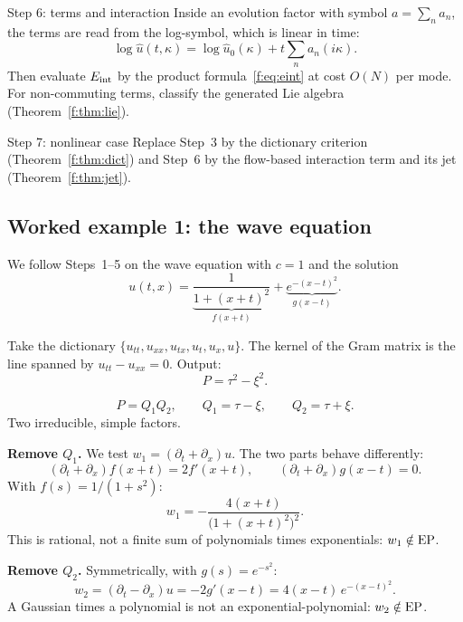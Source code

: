 \begin{aside}{Step 6: terms and interaction}
Inside an evolution factor with symbol $a=\sum_na_n$, the terms are read from the log-symbol, which is linear in time:
\[
\log\hat u(t,\kappa)=\log\hat u_0(\kappa)+t\sum_na_n(i\kappa).
\]
Then evaluate $E_{\mathrm{int}}$ by the product formula~\eqref{f:eq:eint} at cost $O(N)$ per mode. For non-commuting terms, classify the generated Lie algebra (Theorem~\ref{f:thm:lie}).
\end{aside}

\begin{aside}{Step 7: nonlinear case}
Replace Step~3 by the dictionary criterion (Theorem~\ref{f:thm:dict}) and Step~6 by the flow-based interaction term and its jet (Theorem~\ref{f:thm:jet}).
\end{aside}

\subsection{Worked example 1: the wave equation}

We follow Steps~1--5 on the wave equation with $c=1$ and the solution
\[
u(t,x)=\underbrace{\frac{1}{1+(x+t)^2}}_{f(x+t)}+\underbrace{e^{-(x-t)^2}}_{g(x-t)} .
\]

\begin{example}
Take the dictionary $\{u_{tt},u_{xx},u_{tx},u_t,u_x,u\}$. The kernel of the Gram matrix is the line spanned by $u_{tt}-u_{xx}=0$. Output:
\[
P=\tau^2-\xi^2 .
\]
\end{example}

\begin{example}
\[
P=Q_1Q_2,\qquad Q_1=\tau-\xi,\qquad Q_2=\tau+\xi .
\]
Two irreducible, simple factors.
\end{example}

\begin{example}
\textbf{Remove $Q_1$.} We test $w_1=(\partial_t+\partial_x)u$. The two parts behave differently:
\[
(\partial_t+\partial_x)f(x+t)=2f'(x+t),\qquad (\partial_t+\partial_x)g(x-t)=0 .
\]
With $f(s)=1/(1+s^2)$:
\[
w_1=-\frac{4(x+t)}{\big(1+(x+t)^2\big)^2}.
\]
This is rational, not a finite sum of polynomials times exponentials: $w_1\notin\mathrm{EP}$.

\textbf{Remove $Q_2$.} Symmetrically, with $g(s)=e^{-s^2}$:
\[
w_2=(\partial_t-\partial_x)u=-2g'(x-t)=4(x-t)\,e^{-(x-t)^2}.
\]
A Gaussian times a polynomial is not an exponential-polynomial: $w_2\notin\mathrm{EP}$.
\end{example}

